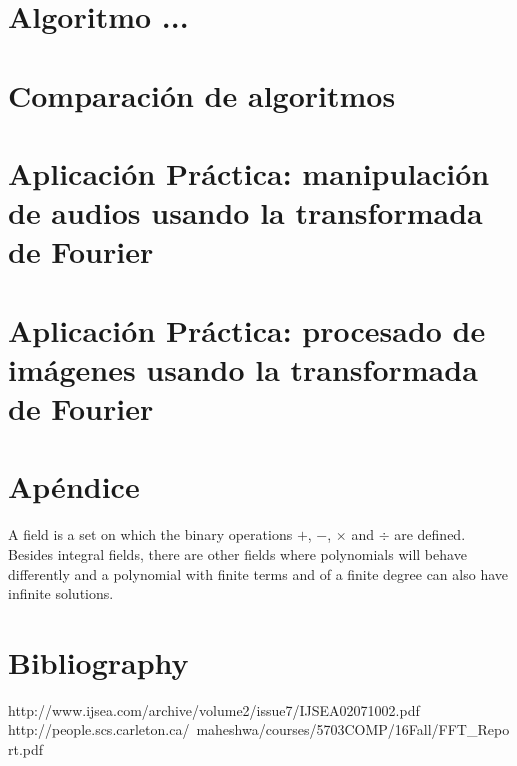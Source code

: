 \documentclass[review,1p]{elsarticle}
\begin{document}
\section{Algoritmo ...}
\section{Comparación de algoritmos}
\section{Aplicación Práctica: manipulación de audios usando la transformada de Fourier}
\section{Aplicación Práctica: procesado de imágenes usando la transformada de Fourier}

\section*{Apéndice}
A field is a set on which the binary operations $+$, $-$, $\times$ and $\div$ are defined.
Besides integral fields, there are other fields where polynomials will behave differently and a polynomial with finite terms and of a finite degree can also have infinite solutions.





\appendix
\section*{Bibliography}
http://www.ijsea.com/archive/volume2/issue7/IJSEA02071002.pdf
http://people.scs.carleton.ca/~maheshwa/courses/5703COMP/16Fall/FFT\_Report.pdf







\end{document}
